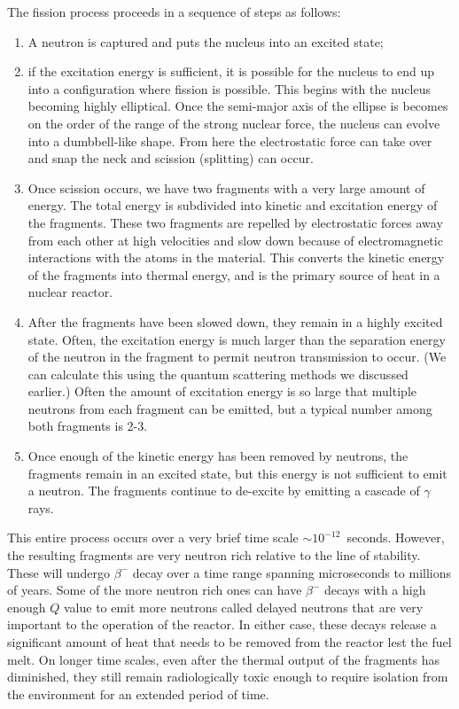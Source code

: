 The fission process proceeds in a sequence of steps as follows:
\begin{enumerate}
  \item A neutron is captured and puts the nucleus into an excited state;
  \item if the excitation energy is sufficient, it is possible for the nucleus to end up into a configuration where fission is possible. This begins with the nucleus becoming highly elliptical. Once the semi-major axis of the ellipse is becomes on the order of the range of the strong nuclear force, the nucleus can evolve into a dumbbell-like shape. From here the electrostatic force can take over and snap the neck and scission (splitting) can occur.
  \item Once scission occurs, we have two fragments with a very large amount of energy. The total energy is subdivided into kinetic and excitation energy of the fragments.  These two fragments are repelled by electrostatic forces away from each other at high velocities and slow down because of electromagnetic interactions with the atoms in the material. This converts the kinetic energy of the fragments into thermal energy, and is the primary source of heat in a nuclear reactor.
  \item After the fragments have been slowed down, they remain in a highly excited state. Often, the excitation energy is much larger than the separation energy of the neutron in the fragment to permit neutron transmission to occur. (We can calculate this using the quantum scattering methods we discussed earlier.) Often the amount of excitation energy is so large that multiple neutrons from each fragment can be emitted, but a typical number among both fragments is 2-3.
  \item Once enough of the kinetic energy has been removed by neutrons, the fragments remain in an excited state, but this energy is not sufficient to emit a neutron. The fragments continue to de-excite by emitting a cascade of $\gamma$ rays.
\end{enumerate}
This entire process occurs over a very brief time scale $\sim 10^{-12}$~seconds. However, the resulting fragments are very neutron rich relative to the line of stability. These will undergo $\beta^-$ decay over a time range spanning microseconds to millions of years. Some of the more neutron rich ones can have $\beta^-$ decays with a high enough $Q$ value to emit more neutrons called delayed neutrons that are very important to the operation of the reactor. In either case, these decays release a significant amount of heat that needs to be removed from the reactor lest the fuel melt. On longer time scales, even after the thermal output of the fragments has diminished, they still remain radiologically toxic enough to require isolation from the environment for an extended period of time.

